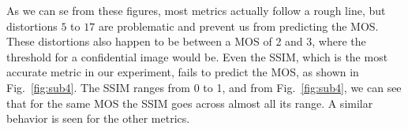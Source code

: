 \documentclass{article}
\begin{document}


As we can se from these figures, most metrics actually follow a rough line, but distortions $5$ to $17$ are problematic and prevent us from predicting the MOS. These distortions also happen to be between a MOS of 2 and 3, where the threshold for a confidential image would be. Even the SSIM, which is the most accurate metric in our experiment, fails to predict the MOS, as shown in Fig.~\ref{fig:sub4}. The SSIM ranges from 0 to 1, and from Fig.~\ref{fig:sub4}, we can see that for the same MOS the SSIM goes across almost all its range. A similar behavior is seen for the other metrics.
\end{document}
